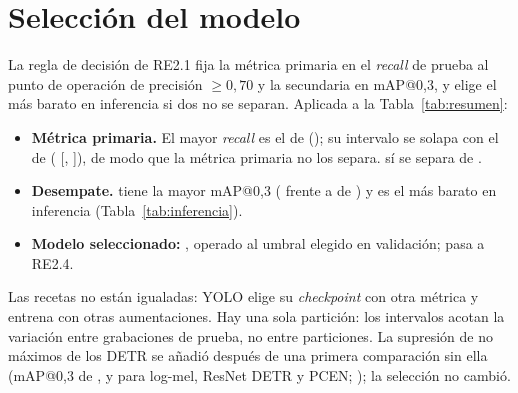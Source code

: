 \documentclass[12pt,a4paper]{article}
\begin{document}
\section{Selección del modelo}
\label{sec:seleccion}

La regla de decisión de RE2.1 fija la métrica primaria en el \textit{recall} de prueba al punto
de operación de precisión $\geq 0{,}70$ y la secundaria en mAP@0,3, y elige el más barato en
inferencia si dos no se separan. Aplicada a la Tabla~\ref{tab:resumen}:

\begin{itemize}
    \item \textbf{Métrica primaria.} El mayor \textit{recall} es el de \topRecallModel{}
          (\topRecall{}); su intervalo se solapa con el de \bestModel{} (\bestRecall{}
          [\bestRecallLow{}, \bestRecallHigh{}]), de modo que la métrica primaria no los
          separa. \bestModel{} sí se separa de \separated{}.
    \item \textbf{Desempate.} \bestModel{} tiene la mayor mAP@0,3 (\bestMap{} frente a
          \topRecallMap{} de \topRecallModel{}) y es el más barato en inferencia
          (Tabla~\ref{tab:inferencia}).
    \item \textbf{Modelo seleccionado: \bestModel{}}, operado al umbral \bestThreshold{}
          elegido en validación; pasa a RE2.4.
\end{itemize}

 Las recetas no están igualadas: YOLO elige su
\emph{checkpoint} con otra métrica y entrena con otras aumentaciones. Hay una sola partición:
los intervalos acotan la variación entre grabaciones de prueba, no entre particiones. La
supresión de no máximos de los DETR se añadió después de una primera comparación sin ella
(mAP@0,3 de \noNmsLogmelMap{}, \noNmsResnetMap{} y \noNmsPcenMap{} para log-mel, ResNet DETR
y PCEN; ); la
selección no cambió.

\clearpage


\end{document}
